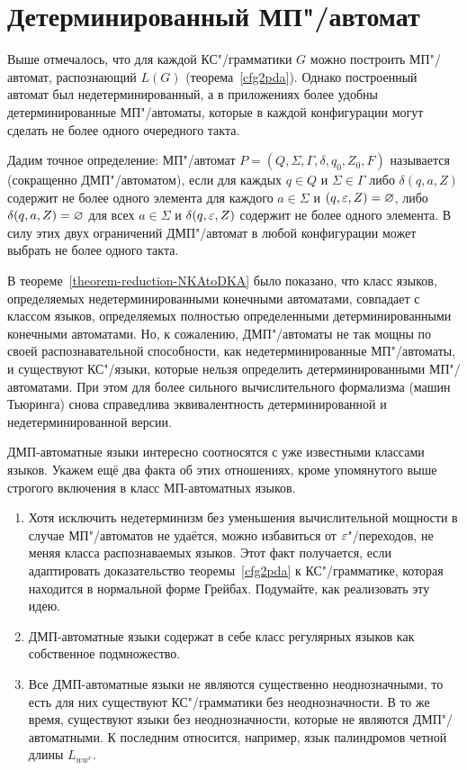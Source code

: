 \section{Детерминированный МП"/автомат}
Выше отмечалось, что для каждой КС"/грамматики $G$ можно построить МП"/автомат, распознающий $L(G)$ (теорема~\ref{cfg2pda}). Однако построенный автомат был недетерминированный, а в приложениях более удобны детерминированные МП"/автоматы, которые в каждой конфигурации могут сделать не более одного очередного такта.

Дадим точное определение: МП"/автомат $P=(Q,\Sigma,\Gamma,\delta,q_0,Z_0,F)$ называется  (сокращенно ДМП"/автоматом), если для каждых $q\in Q$ и $\Sigma\in\Gamma$ либо $\delta(q,a,Z)$ содержит не более одного элемента для каждого $a\in\Sigma$ и $(q,\varepsilon,Z)=\varnothing$, либо $\delta(q,a,Z)=\varnothing$ для всех $a\in\Sigma$ и $\delta(q,\varepsilon,Z)$ содержит не более одного элемента. В силу этих двух ограничений ДМП"/автомат в любой конфигурации может выбрать не более одного такта.

В теореме~\ref{theorem-reduction-NKAtoDKA} было показано, что класс языков, определяемых недетерминированными конечными автоматами, совпадает с классом языков, определяемых полностью определенными детерминированными конечными автоматами. Но, к сожалению, ДМП"/автоматы не так мощны по своей распознавательной способности, как недетерминированные МП"/автоматы, и существуют КС"/языки, которые нельзя определить детерминированными МП"/автоматами. При этом для более сильного
вычислительного формализма (машин Тьюринга) снова справедлива эквивалентность
детерминированной и недетерминированной версии.

ДМП-автоматные языки интересно соотносятся с уже известными классами языков.
Укажем ещё два факта об этих отношениях, кроме упомянутого выше строгого включения
в класс МП-автоматных языков.
\begin{enumerate}
    \item Хотя исключить недетерминизм без уменьшения вычислительной мощности в случае МП"/автоматов не удаётся, можно избавиться от $\varepsilon$"/переходов,
    не меняя класса распознаваемых языков. Этот факт получается,
   если адаптировать доказательство теоремы~\ref{cfg2pda} к КС"/грамматике,
   которая находится в нормальной форме Грейбах. Подумайте, как
   реализовать эту идею.

    \item ДМП-автоматные языки содержат в себе класс регулярных языков как собственное подмножество.

    \item Все ДМП-автоматные языки не являются существенно неоднозначными, то есть для
    них существуют КС"/грамматики без неоднозначности. В то же время,
    существуют языки без неоднозначности, которые не являются ДМП"/автоматными.
     К последним относится, например, язык палиндромов четной длины
     $L_{ww^r}$.
\end{enumerate}

